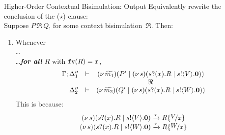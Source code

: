 \documentclass{beamer}
\begin{document}
	\begin{frame}{Higher-Order Contextual Bisimulation: Output}
		Equivalently rewrite the conclusion of the {\color{blue} ($\star$)} clause:
		\\[2mm]

		Suppose $P \,\Re\, Q$, for some context bisimulation~$\Re$. Then:
		\begin{enumerate}[$(\star)$]
			\item	Whenever\\
				\dots\\
				\dots \emph{\textbf{for all} $R$}  with $\mathtt{fv}(R)=x$, 
				\[
					\begin{array}{rcc}
						\Gamma; \Delta_1'' &\vdash& (\nu\, \widetilde{m_1})(P' \;|\; (\nu\, s)(s ? (x) . R \;|\;  s ! \langle V \rangle . \mathbf{0}))
						\\
						&&\Re
						\\
						\Delta_2'' &\vdash&  (\nu\, \widetilde{m_2})(Q' \;|\; (\nu\, s)(s ? (x) . R \;|\; s ! \langle W \rangle . \mathbf{0}))
					\end{array}
				\]
				This is because:
				\[
					\begin{array}{c}
						\newsp{s}{\binp{s}{x} R \Par \bout{s}{V} \inact}
						\by{\tau}
						R \subst{V}{x}
						\\
						\newsp{s}{\binp{s}{x} R \Par \bout{s}{W} \inact}
						\by{\tau}
						R \subst{W}{x}
					\end{array}
				\]
		\end{enumerate}
	\end{frame}
\end{document}
